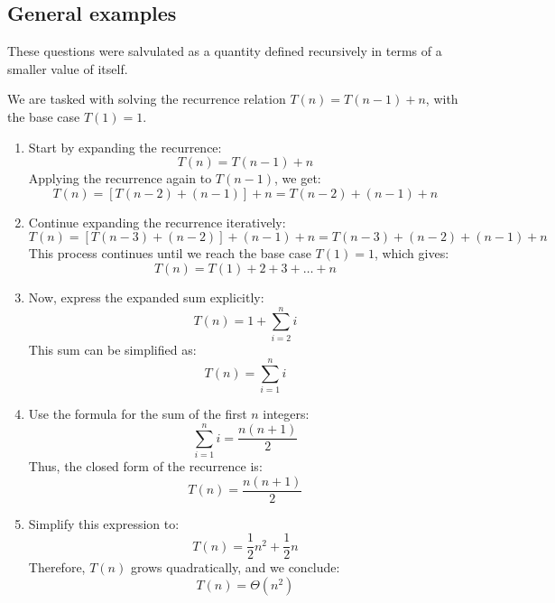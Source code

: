 \subsection{General examples}
These questions were salvulated as a quantity defined recursively in terms of a smaller value of itself.
\begin{example}
    We are tasked with solving the recurrence relation \( T(n) = T(n-1) + n \), with the base case \( T(1) = 1 \).

    \begin{enumerate}[label=\arabic*)]
        \item Start by expanding the recurrence:
        \[
        T(n) = T(n-1) + n
        \]
        Applying the recurrence again to \( T(n-1) \), we get:
        \[
        T(n) = [T(n-2) + (n-1)] + n = T(n-2) + (n-1) + n
        \]
        
        \item Continue expanding the recurrence iteratively:
        \[
        T(n) = [T(n-3) + (n-2)] + (n-1) + n = T(n-3) + (n-2) + (n-1) + n
        \]
        This process continues until we reach the base case \( T(1) = 1 \), which gives:
        \[
        T(n) = T(1) + 2 + 3 + \dots + n
        \]
        
        \item Now, express the expanded sum explicitly:
        \[
        T(n) = 1 + \sum_{i=2}^{n} i
        \]
        This sum can be simplified as:
        \[
        T(n) = \sum_{i=1}^{n} i
        \]
        
        \item Use the formula for the sum of the first \( n \) integers:
        \[
        \sum_{i=1}^{n} i = \frac{n(n+1)}{2}
        \]
        Thus, the closed form of the recurrence is:
        \[
        T(n) = \frac{n(n+1)}{2}
        \]
        
        \item Simplify this expression to:
        \[
        T(n) = \frac{1}{2}n^2 + \frac{1}{2}n
        \]
        Therefore, \( T(n) \) grows quadratically, and we conclude:
        \[
        T(n) = \Theta(n^2)
        \]
    \end{enumerate}
\end{example}

